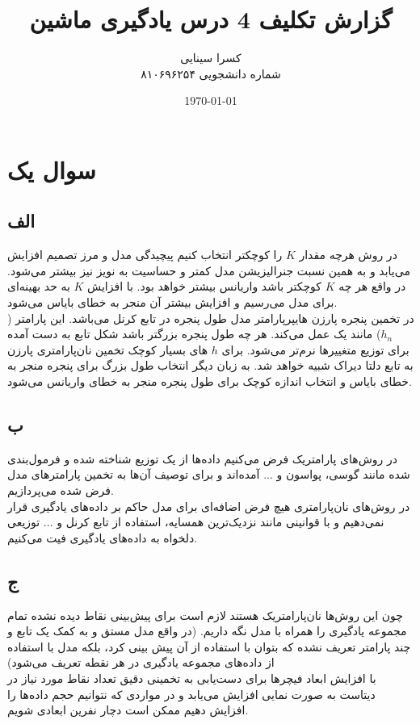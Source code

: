 \documentclass[12pt,onecolumn,a4paper]{article}
\begin{document}
\title{گزارش تکلیف 4 درس یادگیری ماشین} 
\author{کسرا سینایی\\
شماره دانشجویی ۸۱۰۶۹۶۲۵۴\\
}
\date{\today}
\maketitle
\thispagestyle{empty}
\newpage
\section{سوال یک}
\subsection*{الف}
در روش  هرچه مقدار $K$ را کوچکتر انتخاب کنیم پیچیدگی مدل و مرز تصمیم افزایش می‌یابد و به همین نسبت جنرالیزیشن مدل کمتر و حساسیت به نویز نیز بیشتر می‌شود. در واقع هر چه $K$ کوچکتر باشد واریانس بیشتر خواهد بود. با افزایش $K$ به حد بهینه‌ای برای مدل می‌رسیم و افزایش بیشتر آن منجر به خطای بایاس می‌شود.
\\
در تخمین پنجره پارزن هایپرپارامتر مدل طول پنجره در تابع کرنل می‌باشد. این پارامتر ($h_{n}$) مانند یک  عمل می‌کند. هر چه طول پنجره بزرگتر باشد شکل تابع به دست آمده برای توزیع متغییرها نرم‌تر می‌شود. برای $h$ های بسیار کوچک تخمین نان‌پارامتری پارزن به تابع دلتا دیراک شبیه خواهد شد. به زبان دیگر انتخاب طول بزرگ برای پنجره منجر به خطای بایاس و انتخاب اندازه کوچک برای طول پنجره منجر به خطای واریانس می‌شود.
\subsection*{ب}
در روش‌های پارامتریک فرض می‌کنیم داده‌ها از یک توزیع شناخته شده و فرمول‌بندی شده مانند گوسی، پواسون و ... آمده‌اند و برای توصیف آن‌ها به تخمین پارامترهای مدل فرض شده می‌پردازیم.
\\
در روش‌های نان‌پارامتری هیچ فرض اضافه‌ای برای مدل حاکم بر داده‌های یادگیری قرار نمی‌دهیم و با قوانینی مانند نزدیک‌ترین همسایه‌، استفاده از تابع کرنل و ... توزیعی دلخواه به داده‌های یادگیری فیت می‌کنیم.
\subsection*{ج}
چون این روش‌ها نان‌پارامتریک هستند لازم است برای پیش‌بینی نقاط دیده نشده تمام مجموعه یادگیری را همراه با مدل نگه داریم. (در واقع مدل مستق و به کمک یک تابع و چند پارامتر تعریف نشده که بتوان با استفاده از آن پیش بینی کرد، بلکه مدل با استفاده از داده‌های مجموعه یادگیری در هر نقطه تعریف می‌شود)
\\
با افزایش ابعاد فیچرها برای دست‌یابی به تخمینی دقیق تعداد نقاط مورد نیاز در دیتاست به صورت نمایی افزایش می‌یابد و در مواردی که نتوانیم حجم داده‌ها را افزایش دهیم ممکن است دچار نفرین ابعادی شویم.
\end{document}

